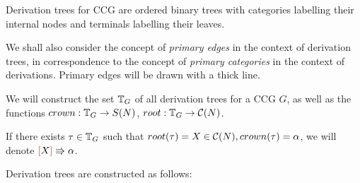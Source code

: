 \documentclass[main.tex]{subfiles}
\begin{document}
Derivation trees for CCG are ordered binary trees with categories labelling
their internal nodes and terminals labelling their leaves.

We shall also consider the concept of \emph{primary edges} in the context
of derivation trees, in correspondence to the concept of
\emph{primary categories} in the context of derivations. Primary edges
will be drawn with a thick line.

We will construct the set $ \mathbb{T}_{ G } $ of all derivation trees for a
CCG $G$, as well
as the functions $ crown: \mathbb{T}_{ G } \rightarrow S(N) $,
$ root: \mathbb{T}_{ G } \rightarrow \mathcal{C}( N )$.

If there exists $\tau \in \mathbb{T}_{ G }$ such that $root(\tau) = X \in \mathcal{C}( N ),
crown(\tau) = \alpha$, we will denote $\textcolor{red}{[} X \textcolor{red}{]} \Rrightarrow \alpha$.

Derivation trees are constructed as follows:
\end{document}
